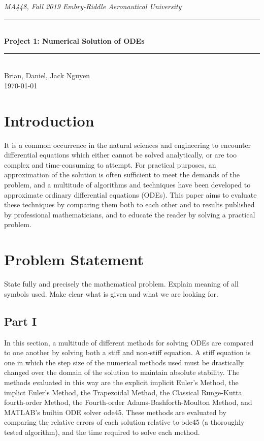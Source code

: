 \documentclass[11pt]{article}
\newcommand{\horrule}[1]{\rule{\linewidth}{#1}}      %
\begin{document}
\begin{center}
{\it MA448, Fall 2019  \hfill Embry-Riddle Aeronautical University
 }\\
\horrule{0.5pt} \\[0.4cm]
{\bf \Large  %
Project 1: Numerical Solution of ODEs
}\\
\horrule{2pt} \\[5cm]
Brian, Daniel, Jack Nguyen %
\\[0.4cm]
\today %
\end{center}
\thispagestyle{empty}
\newpage
\begin{abstract}
\end{abstract}
\tableofcontents 
\newpage
\section{Introduction}\label{S:1}
It is a common occurrence in the natural sciences and engineering to encounter
differential equations which either cannot be solved analytically, or are too 
complex and time-consuming to attempt. For practical purposes, an approximation
of the solution is often sufficient to meet the demands of the problem, and a
multitude of algorithms and techniques have been developed to approximate 
ordinary differential equations (ODEs). This paper aims to evaluate these techniques by 
comparing them both to each other and to results published by professional mathematicians, 
and to educate the reader by solving a practical problem.
\section{Problem Statement}\label{S:2}
State fully and precisely the mathematical problem.  
Explain meaning of all symbols used. Make clear what is given and what we are 
looking for. 
\subsection{Part I}\label{S:2.1}
%
In this section, a multitude of different methods for solving ODEs are compared 
to one another by solving both a stiff and non-stiff equation. A stiff equation
is one in which the step size of the numerical methods used must be drastically
changed over the domain of the solution to maintain absolute stability. The 
methods evaluated in this way are the explicit implicit Euler's Method, the
implict Euler's Method, the Trapezoidal Method, the Classical Runge-Kutta 
fourth-order Method, the Fourth-order Adams-Bashforth-Moulton Method, and MATLAB's
builtin ODE solver ode45. These methods are evaluated by comparing the relative
errors of each solution relative to ode45 (a thoroughly tested algorithm), and 
the time required to solve each method.
\end{document}
